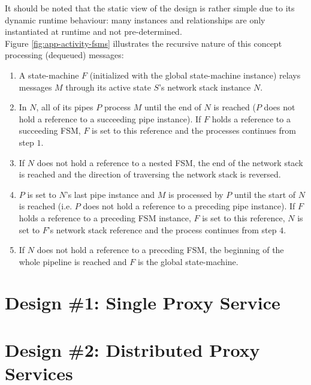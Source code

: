 It should be noted that the static view of the design is rather simple due to its dynamic runtime behaviour: many instances and relationships are only instantiated at runtime and not pre-determined.\\
Figure \ref{fig:app-activity-fsms} illustrates the recursive nature of this concept processing (dequeued) messages:
\begin{enumerate}
    \item A state-machine $F$ (initialized with the global state-machine instance) relays messages $M$ through its active state $S$'s network stack instance $N$.
    \item In $N$, all of its pipes $P$ process $M$ until the end of $N$ is reached ($P$ does not hold a reference to a succeeding pipe instance). If $F$ holds a reference to a succeeding \ac{FSM}, $F$ is set to this reference and the processes continues from step $1$.
    \item If $N$ does not hold a reference to a nested \ac{FSM}, the end of the network stack is reached and the direction of traversing the network stack is reversed.
    \item $P$ is set to $N$'s last pipe instance and $M$ is processed by $P$ until the start of $N$ is reached (i.e. $P$ does not hold a reference to a preceding pipe instance). If $F$ holds a reference to a preceding \ac{FSM} instance, $F$ is set to this reference, $N$ is set to $F$'s network stack reference and the process continues from step $4$.
    \item If $N$ does not hold a reference to a preceding \ac{FSM}, the beginning of the whole pipeline is reached and $F$ is the global state-machine.
\end{enumerate}


\section{Design \#1: Single Proxy Service}

\section{Design \#2: Distributed Proxy Services}


